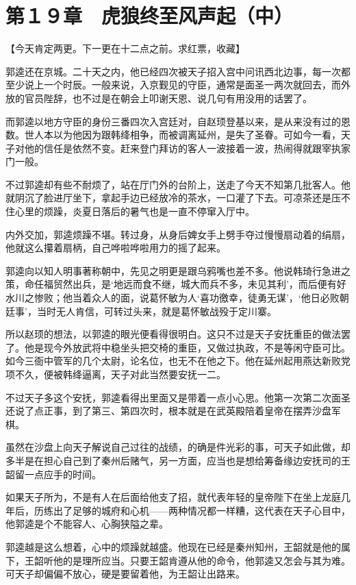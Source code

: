 \section{第１９章　虎狼终至风声起（中）}

【今天肯定两更。下一更在十二点之前。求红票，收藏】

郭逵还在京城。二十天之内，他已经四次被天子招入宫中问讯西北边事，每一次都至少说上一个时辰。一般来说，入京觐见的守臣，通常是面圣一两次就回去，而外放的官员陛辞，也不过是在朝会上叩谢天恩、说几句有用没用的话罢了。

而郭逵以地方守臣的身份三番四次入宫廷对，自赵顼登基以来，是从来没有过的恩数。世人本以为他因为跟韩绛相争，而被调离延州，是失了圣眷。可如今一看，天子对他的信任是依然不变。赶来登门拜访的客人一波接着一波，热闹得就跟宰执家门一般。

不过郭逵却有些不耐烦了，站在厅门外的台阶上，送走了今天不知第几批客人。他就阴沉了脸进厅坐下，拿起手边已经放冷的茶水，一口灌了下去。可凉茶还是压不住心里的烦躁，炎夏日落后的暑气也是一直不停窜入厅中。

内外交加，郭逵烦躁不堪。转过身，从身后婢女手上劈手夺过慢慢扇动着的绢扇，他就这么攥着扇柄，自己哗啦哗啦用力的摇了起来。

郭逵向以知人明事著称朝中，先见之明更是跟乌鸦嘴也差不多。他说韩琦行急进之策，命任福贸然出兵，是‘地远而食不继，城大而兵不多，未见其利’，而后便有好水川之惨败；他当着众人的面，说葛怀敏为人‘喜功徼幸，徒勇无谋’，‘他日必败朝廷事’，当时无人肯信，可转过头来，就是葛怀敏战殁于定川寨。

所以赵顼的想法，以郭逵的眼光便看得很明白。这只不过是天子安抚重臣的做法罢了。他是现今外放武将中稳坐头把交椅的重臣，又做过执政，不是等闲守臣可比。如今三衙中管军的几个太尉，论名位，也无不在他之下。他在延州起用燕达新败党项不久，便被韩绛逼离，天子对此当然要安抚一二。

不过天子多这个安抚，郭逵看得出里面又是带着一点小心思。他第一次第二次面圣还说了点正事，到了第三、第四次时，根本就是在武英殿陪着皇帝在摆弄沙盘军棋。

虽然在沙盘上向天子解说自己过往的战绩，的确是件光彩的事，可天子如此做，却多半是在担心自己到了秦州后赌气，另一方面，应当也是想给筹备缘边安抚司的王韶留一点应手的时间。

如果天子所为，不是有人在后面给他支了招，就代表年轻的皇帝陛下在坐上龙庭几年后，历练出了足够的城府和心机——两种情况都一样糟，这代表在天子心目中，他郭逵是个不能容人、心胸狭隘之辈。

郭逵越是这么想着，心中的烦躁就越盛。他现在已经是秦州知州，王韶就是他的属下，王韶听他的是理所应当。只要王韶肯遵从他的命令，他郭逵又怎会与其为难。可天子却偏偏不放心，硬是要留着他，为王韶让出路来。

